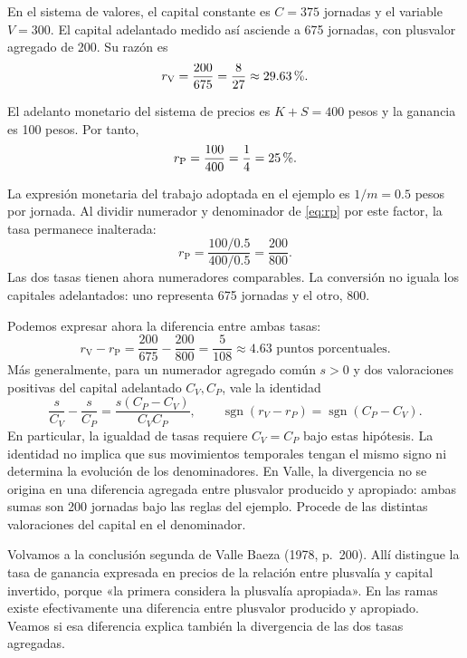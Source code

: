 \documentclass[10pt,twoside]{article}
\newcommand{\pct}{\ifmmode\text{\char37}\else\char37\fi}
\newcommand{\val}{\mathrm{V}}
\newcommand{\mon}{\mathrm{P}}
\begin{document}
En el sistema de valores, el capital constante es $C=375$ jornadas y el variable $V=300$. El capital adelantado medido así asciende a 675 jornadas, con plusvalor agregado de 200. Su razón es
\begin{equation}
r_{\val}=\frac{200}{675}=\frac8{27}\approx29.63\,\pct.\label{eq:rv}
\end{equation}

El adelanto monetario del sistema de precios es $K+S=400$ pesos y la ganancia es 100 pesos. Por tanto,
\begin{equation}
r_{\mon}=\frac{100}{400}=\frac14=25\,\pct.\label{eq:rp}
\end{equation}

La expresión monetaria del trabajo adoptada en el ejemplo es $1/m=0.5$ pesos por jornada. Al dividir numerador y denominador de \eqref{eq:rp} por este factor, la tasa permanece inalterada:
\[
r_{\mon}=\frac{100/0.5}{400/0.5}
=\frac{200}{800}.
\]
Las dos tasas tienen ahora numeradores comparables. La conversión no iguala los capitales adelantados: uno representa 675 jornadas y el otro, 800.

Podemos expresar ahora la diferencia entre ambas tasas:
\begin{equation}
r_{\val}-r_{\mon}
=\frac{200}{675}-\frac{200}{800}
=\frac5{108}\approx4.63\text{ puntos porcentuales}.\label{eq:dif}
\end{equation}
Más generalmente, para un numerador agregado común $s>0$ y dos valoraciones positivas del capital adelantado $C_V,C_P$, vale la identidad
\[
\frac{s}{C_V}-\frac{s}{C_P}=\frac{s(C_P-C_V)}{C_VC_P},\qquad
\operatorname{sgn}(r_V-r_P)=\operatorname{sgn}(C_P-C_V).
\]
En particular, la igualdad de tasas requiere $C_V=C_P$ bajo estas hipótesis. La identidad no implica que sus movimientos temporales tengan el mismo signo ni determina la evolución de los denominadores. En Valle, la divergencia no se origina en una diferencia agregada entre plusvalor producido y apropiado: ambas sumas son 200 jornadas bajo las reglas del ejemplo. Procede de las distintas valoraciones del capital en el denominador.

Volvamos a la conclusión segunda de Valle Baeza (1978, p.~200). Allí distingue la tasa de ganancia expresada en precios de la relación entre plusvalía y capital invertido, porque «la primera considera la plusvalía apropiada». En las ramas existe efectivamente una diferencia entre plusvalor producido y apropiado. Veamos si esa diferencia explica también la divergencia de las dos tasas agregadas.
\end{document}
